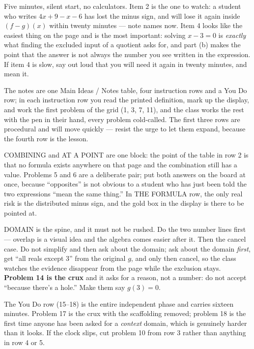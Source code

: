 \documentclass[10pt]{article}
\begin{document}
\begin{teachernote}[Warm-Up]
Five minutes, silent start, no calculators. Item 2 is the one to watch: a student
who writes $4x + 9 - x - 6$ has lost the minus sign, and will lose it again
inside $(f-g)(x)$ within twenty minutes --- note names now. Item 4 looks like the
easiest thing on the page and is the most important: solving $x - 3 = 0$ is
\emph{exactly} what finding the excluded input of a quotient asks for, and part
(b) makes the point that the answer is not always the number you see written in
the expression. If item 4 is slow, say out loud that you will need it again in
twenty minutes, and mean it.
\end{teachernote}

\begin{teachernote}
The notes are one Main Ideas / Notes table, four instruction rows and a You Do
row; in each instruction row you read the printed definition, mark up the
display, and work the first problem of the grid (1, 3, 7, 11), and the class
works the rest with the pen in their hand, every problem cold-called. The first
three rows are procedural and will move quickly --- resist the urge to let them
expand, because the fourth row is the lesson.

COMBINING and AT A POINT are one block: the point of the table in row 2 is that
no formula exists anywhere on that page and the combination still has a value.
Problems 5 and 6 are a deliberate pair; put both answers on the board at once,
because ``opposites'' is not obvious to a student who has just been told the two
expressions ``mean the same thing.'' In THE FORMULA row, the only real risk is
the distributed minus sign, and the gold box in the display is there to be
pointed at.

DOMAIN is the spine, and it must not be rushed. Do the two number lines first ---
overlap is a visual idea and the algebra comes easier after it. Then the cancel
case. Do not simplify and then ask about the domain; ask about the domain
\emph{first}, get ``all reals except 3'' from the original $g$, and only then
cancel, so the class watches the evidence disappear from the page while the
exclusion stays. \textbf{Problem 14 is the crux} and it asks for a reason, not a
number: do not accept ``because there's a hole.'' Make them say $g(3) = 0$.

The You Do row (15--18) is the entire independent phase and carries sixteen
minutes. Problem 17 is the crux with the scaffolding removed; problem 18 is the
first time anyone has been asked for a \emph{context} domain, which is genuinely
harder than it looks. If the clock slips, cut problem 10 from row 3 rather than
anything in row 4 or 5.
\end{teachernote}
\end{document}
